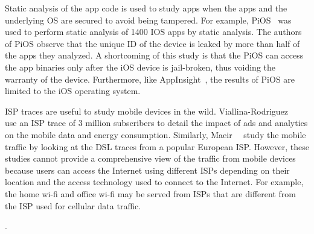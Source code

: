 Static analysis of the app code is used to study apps when the apps and the
underlying OS are secured to avoid being tampered. For example,
PiOS~\cite{egele:pios} was used to perform static analysis of 1400 IOS apps
by static analysis. The authors of PiOS observe that the unique ID of the
device is leaked by more than half of the apps they analyzed. A shortcoming
of this study is that the PiOS can access the app binaries only after the
iOS device is jail-broken, thus voiding the warranty of the device.
Furthermore, like AppInsight~\cite{ravindranath:appinsight}, the results of
PiOS are limited to the iOS operating system. 

ISP traces are useful to study mobile devices in the wild.
Viallina-Rodriguez~\etal~\cite{vallina-rod:ads} use an ISP trace of 3
million subscribers to detail the impact of ads and analytics on the mobile
data and energy consumption. Similarly, Maeir~\etal~\cite{maier:mobtraffic}
study the mobile traffic by looking at the DSL traces from a popular
European ISP. However, these studies cannot provide a comprehensive view of
the traffic from mobile devices because users can access the Internet using
different ISPs depending on their location and the access technology used
to connect to the Internet. For example, the home wi-fi and office wi-fi
may be served from ISPs that are different from the ISP used for cellular
data traffic. 


. 






